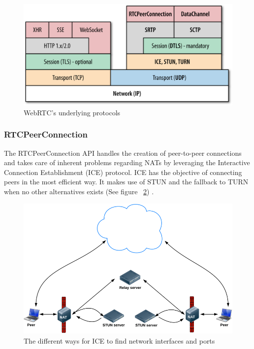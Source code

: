 \begin{figure}[htp]
\centering
\includegraphics[width=\textwidth,height=0.25\paperheight,keepaspectratio
]{figures/webrtc_protocol_stack}
\caption{WebRTC's underlying protocols \cite{WebRTCProtocolStack:Online}}
\label{fig:WebRTCProtocols}
\end{figure}


\subsubsection{RTCPeerConnection}
The RTCPeerConnection API handles the creation of peer-to-peer connections and takes care of inherent problems regarding NATs by leveraging the Interactive Connection Establishment (ICE) protocol\cite{RFC5245:Online}. ICE has the objective of connecting peers in the most efficient way. It makes use of STUN and the fallback to TURN when no other alternatives exists (See figure ~\ref{fig:ICE}) .

\begin{figure}[htp]
\centering
\includegraphics[width=\textwidth,height=0.25\paperheight,keepaspectratio
]{figures/ICE}
\caption{The different ways for ICE to find network interfaces and ports \cite{WebRTCBasics:2012:Online}}
\label{fig:ICE}
\end{figure}

